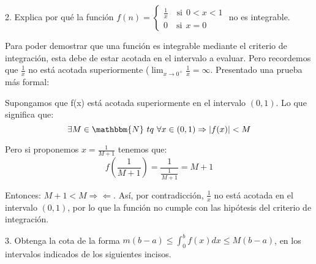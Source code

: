 \documentclass[12pt]{article}
\begin{document}
2. Explica por qu\'e la funci\'on
\(f(n)=
\begin{cases}
    \displaystyle\frac{1}{x} \quad \text{si} \ \ 0<x<1\\
    0 \quad \text{si} \ \ x=0
\end{cases}
\) no es integrable.\bigskip

    Para poder demostrar que una funci\'on es integrable mediante el criterio de integraci\'on, esta debe de estar acotada en el intervalo a evaluar. Pero recordemos que \(\frac{1}{x}\) no est\'a acotada superiormente (\(\lim_{x\to0^+}\frac{1}{x}=\infty\). Presentado una prueba m\'as formal:\medskip

    Supongamos que f(x) est\'a acotada superiormente en el intervalo \((0,1)\). Lo que significa que:
    \[\exists M\in\mathbbm{N} \ tq \ \forall x\in(0,1) \Rightarrow \left|f(x)\right|<M\]

    Pero si proponemos \(\displaystyle x=\frac{1}{M+1}\) tenemos que:
    \[f\left(\frac{1}{M+1}\right)=\frac{1}{\frac{1}{M+1}}=M+1\]

    Entonces: \(\displaystyle M+1<M \Rightarrow\!\Leftarrow\). As\'i, por contradicci\'on, \(\displaystyle\frac{1}{x}\) no est\'a acotada en el intervalo \((0,1)\), por lo que la funci\'on no cumple con las hip\'otesis del criterio de integraci\'on.\medskip

3. Obtenga la cota de la forma \(m(b-a) \leq \displaystyle\int_{0}^{b}f(x)dx \leq M(b-a)\), en los intervalos indicados de los siguientes incisos.
\end{document}
